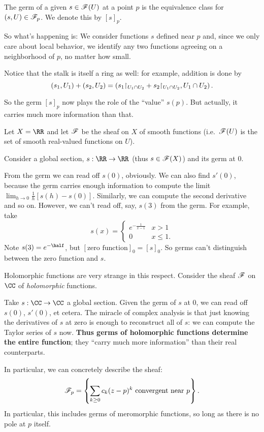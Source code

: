 \documentclass[11pt]{scrreprt}
\begin{document}
\begin{definition}
	The germ of a given $s \in \mathscr F(U)$ at a point $p$
	is the equivalence class for $(s,U) \in \mathscr F_p$.
	We denote this by $[s]_p$.
\end{definition}

So what's happening is: We consider functions $s$ defined near $p$
and, since we only care about local behavior,
we identify any two functions agreeing on a neighborhood of $p$,
no matter how small.

Notice that the stalk is itself a ring as well:
for example, addition is done by
\[ 
	\left( s_1, U_1 \right) + \left( s_2, U_2 \right)
	=
	\left( s_1 \restrict{U_1 \cap U_2} + s_2 \restrict{U_1 \cap U_2},
	U_1 \cap U_2 \right).
\]

So the germ $[s]_p$ now plays the role of the ``value'' $s(p)$.
But actually, it carries much more information than that.

\begin{example}
	Let $X = \RR$ and let $\mathscr F$ be the sheaf on $X$ of smooth functions
	(i.e.\ $\mathscr F(U)$ is the set of smooth real-valued functions on $U$).

	Consider a global section, $s : \RR \to \RR$ (thus $s \in \mathscr F(X)$)
	and its germ at $0$.
	\begin{enumerate}[(a)]
		\ii From the germ we can read off $s(0)$, obviously.
		\ii We can also find $s'(0)$, because the germ carries enough
		information to compute the limit $\lim_{h \to 0} \frac1h[s(h)-s(0)]$.
		\ii Similarly, we can compute the second derivative and so on.
		\ii However, we can't read off, say, $s(3)$ from the germ.
		For example, take
		\[
			s(x) = \begin{cases}
				e^{-\frac{1}{x-1}} & x > 1 \\
				0 & x \le 1.
			\end{cases}
		\]
		Note $s(3) = e^{-\half}$, but $[\text{zero function}]_0 = [s]_0$.
		So germs can't distinguish between the zero function and $s$.
	\end{enumerate}
\end{example}
\begin{example}
	Holomorphic functions are very strange in this respect.
	Consider the sheaf $\mathscr F$ on $\CC$ of \emph{holomorphic} functions.

	Take $s : \CC \to \CC$ a global section.
	Given the germ of $s$ at $0$, we can read off $s(0)$, $s'(0)$, et cetera.
	The miracle of complex analysis is that just knowing
	the derivatives of $s$ at zero is enough to reconstruct all of $s$:
	we can compute the Taylor series of $s$ now.
	\textbf{Thus germs of holomorphic functions determine the entire function};
	they ``carry much more information'' than their real counterparts.
	
	In particular, we can concretely describe the sheaf:
	\[
		\mathscr F_p = \left\{
			\sum_{k \ge 0} c_k (z-p)^k
			\text{ convergent near $p$}
		\right\}.
	\]
	In particular, this includes germs of meromorphic functions,
	so long as there is no pole at $p$ itself.
\end{example}
\end{document}

